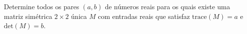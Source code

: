 Determine todos os pares \((a, b)\) de números reais para os quais existe uma matriz simétrica \(2\times 2\) única \(M\) com entradas reais que satisfaz \(\mathrm{trace}(M)=a\) e \(\mathrm{det}(M)=b\).
